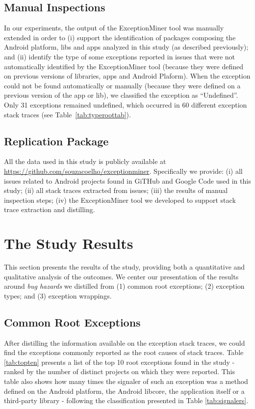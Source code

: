 \documentclass[conference]{IEEEtran}
\begin{document}
\subsection{Manual Inspections}
\label{sec:manual}
In our experiments, the output of the ExceptionMiner tool was manually extended
in order to 
(i) support the identification of packages composing the Android platform, 
libs and apps analyzed in this study (as described previously); and (ii)  
identify the type of some exceptions reported in issues 
that were not automatically identified by the ExceptionMiner tool
(because they were defined on previous versions of libraries,
apps and Android Plaform). When the exception could not be  
found automatically or manually (because they were defined on a previous version
of the app or lib), we classified the exception as ``Undefined''.  Only 31 exceptions 
remained undefined, which occurred in 60 different exception stack traces (see Table~\ref{tab:typeroottab}).

\subsection{Replication Package}
All the data used in this study is publicly available at \url{https://github.com/souzacoelho/exceptionminer}.
Specifically we provide: (i) all issues related to Android projects found
in GiTHub and Google Code used in this study; (ii) all stack traces extracted
from issues; (iii) the results of manual inspection steps; (iv) the
ExceptionMiner tool we developed to support stack trace extraction and distilling.



\section{The Study Results}
\label{sec:result}

This section presents the results of the study, providing both a
quantitative and qualitative analysis of the outcomes. 
We center our presentation of the results around \emph{bug hazards} we
distilled from (1) common root exceptions; (2) exception types; and
(3) exception wrappings.

\subsection{Common Root Exceptions}

After distilling the information available on the exception stack traces, we could find 
the exceptions commonly reported as the root causes of stack traces.
Table \ref{tab:topten} presents a list of the top 10 root exceptions found in the study - 
 ranked by the number of distinct projects on which they were reported. 
This table also shows how many times the signaler of such an exception was a method defined on
the Android platform, the Android libcore, the application itself or a third-party library -
 following the classification presented in Table  \ref{tab:signalers}. 
\end{document}
